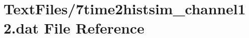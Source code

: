 \hypertarget{7time2histsim__channel12_8dat}{}\section{Text\+Files/7time2histsim\+\_\+channel12.dat File Reference}
\label{7time2histsim__channel12_8dat}

